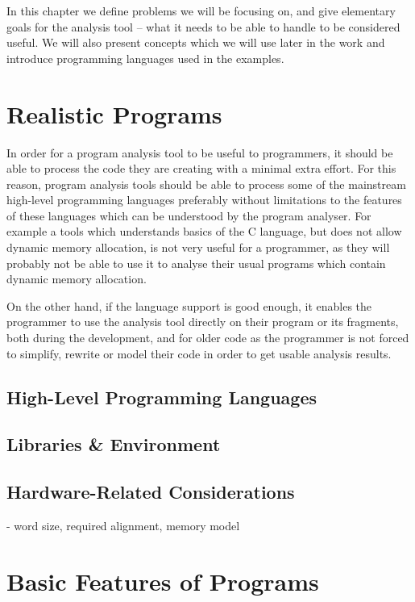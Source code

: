 In this chapter we define problems we will be focusing on, and give elementary goals for the analysis tool -- what it needs to be able to handle to be considered useful.
We will also present concepts which we will use later in the work and introduce programming languages used in the examples.

\section{Realistic Programs}

In order for a program analysis tool to be useful to programmers, it should be able to process the code they are creating with a minimal extra effort.
For this reason, program analysis tools should be able to process some of the mainstream high-level programming languages preferably without limitations to the features of these languages which can be understood by the program analyser.
For example a tools which understands basics of the C language, but does not allow dynamic memory allocation, is not very useful for a programmer, as they will probably not be able to  use it to analyse their usual programs which contain dynamic memory allocation.

On the other hand, if the language support is good enough, it enables the programmer to use the analysis tool directly on their program or its fragments, both during the development, and for older code as the programmer is not forced to simplify, rewrite or model their code in order to get usable analysis results.

\subsection{High-Level Programming Languages}

\subsection{Libraries \& Environment}

\subsection{Hardware-Related Considerations}

- word size, required alignment, memory model

\section{Basic Features of Programs}


